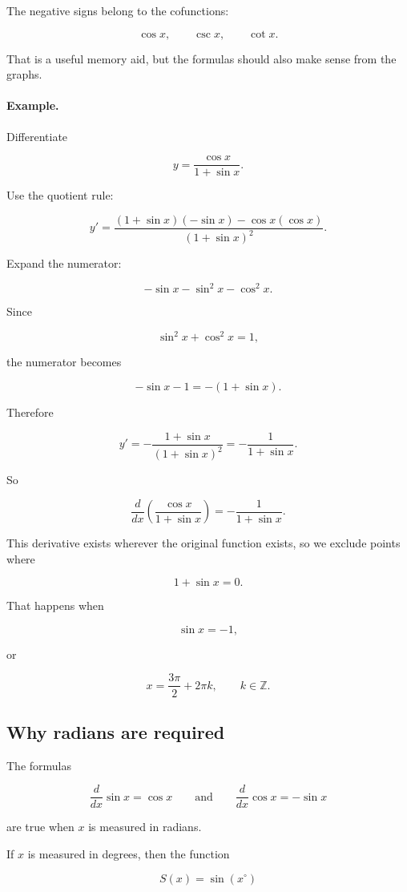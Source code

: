 The negative signs belong to the cofunctions:

\[
\cos x,\qquad \csc x,\qquad \cot x.
\]

That is a useful memory aid, but the formulas should also make sense from the graphs.

\paragraph{Example.}
Differentiate

\[
y=\frac{\cos x}{1+\sin x}.
\]

Use the quotient rule:

\[
y'
=
\frac{(1+\sin x)(-\sin x)-\cos x(\cos x)}{(1+\sin x)^2}.
\]

Expand the numerator:

\[
-\sin x-\sin^2x-\cos^2x.
\]

Since

\[
\sin^2x+\cos^2x=1,
\]

the numerator becomes

\[
-\sin x-1=-(1+\sin x).
\]

Therefore

\[
y'
=
-\frac{1+\sin x}{(1+\sin x)^2}
=
-\frac1{1+\sin x}.
\]

So

\[
\boxed{
\frac{d}{dx}\left(\frac{\cos x}{1+\sin x}\right)
=
-\frac1{1+\sin x}.
}
\]

This derivative exists wherever the original function exists, so we exclude points where

\[
1+\sin x=0.
\]

That happens when

\[
\sin x=-1,
\]

or

\[
x=\frac{3\pi}{2}+2\pi k,
\qquad k\in\mathbb Z.
\]

\subsection{Why radians are required}
\label{subsec:radians-required}

The formulas

\[
\frac{d}{dx}\sin x=\cos x
\qquad\text{and}\qquad
\frac{d}{dx}\cos x=-\sin x
\]

are true when \(x\) is measured in radians.

If \(x\) is measured in degrees, then the function

\[
S(x)=\sin(x^\circ)
\]

